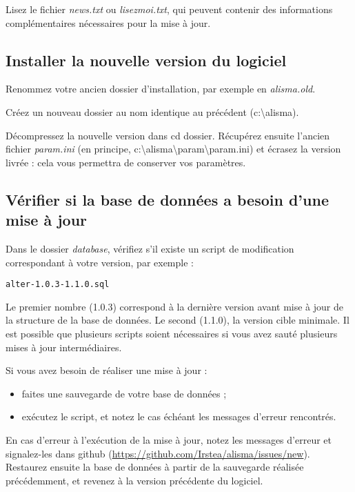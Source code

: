 Lisez le fichier \textit{news.txt} ou \textit{lisezmoi.txt}, qui peuvent contenir des informations complémentaires nécessaires pour la mise à jour.

\subsection{Installer la nouvelle version du logiciel}

Renommez votre ancien dossier d'installation, par exemple en \textit{alisma.old}.

Créez un nouveau dossier au nom identique au précédent (c:\textbackslash{}alisma).

Décompressez la nouvelle version dans cd dossier. Récupérez ensuite l'ancien fichier \textit{param.ini} (en principe, c:\textbackslash{}alisma\textbackslash{}param\textbackslash{}param.ini) et écrasez la version livrée : cela vous permettra de conserver vos paramètres.

\subsection{Vérifier si la base de données a besoin d'une mise à jour}
\label{dbmaj}

Dans le dossier \textit{database}, vérifiez s'il existe un script de modification correspondant à votre version, par exemple :

\begin{lstlisting}
alter-1.0.3-1.1.0.sql
\end{lstlisting}

Le premier nombre (1.0.3) correspond à la dernière version avant mise à jour de la structure de la base de données. Le second (1.1.0), la version cible minimale. Il est possible que plusieurs scripts soient nécessaires si vous avez sauté plusieurs mises à jour intermédiaires.

Si vous avez besoin de réaliser une mise à jour :
\begin{itemize}
\item faites une sauvegarde de votre base de données ;
\item exécutez le script, et notez le cas échéant les messages d'erreur rencontrés.
\end{itemize}

En cas d'erreur à l'exécution de la mise à jour, notez les messages d'erreur et signalez-les dans github (\url{https://github.com/Irstea/alisma/issues/new}).
Restaurez ensuite la base de données à partir de la sauvegarde réalisée précédemment, et revenez à la version précédente du logiciel.

